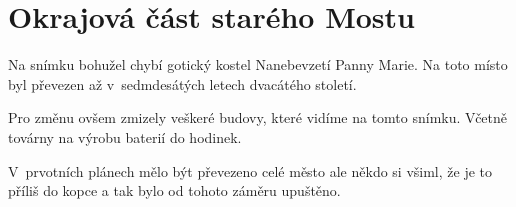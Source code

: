 
\chapter{Okrajová část starého Mostu}

Na snímku bohužel chybí gotický kostel Nanebevzetí Panny Marie. Na toto místo
byl převezen až v~sedmdesátých letech dvacátého století.

Pro změnu ovšem zmizely veškeré budovy, které vidíme na tomto snímku.
Včetně továrny na výrobu baterií do hodinek.

V~prvotních plánech mělo být převezeno celé město ale někdo si všiml,
že je to příliš do kopce a tak bylo od tohoto záměru upuštěno.

